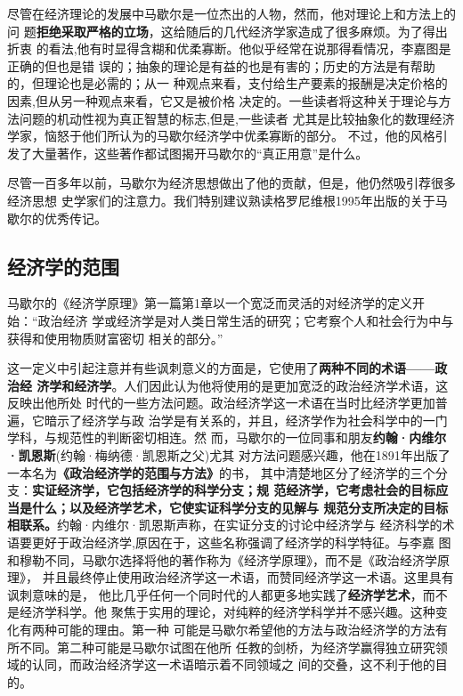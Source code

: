 尽管在经济理论的发展中马歇尔是一位杰出的人物，然而，他对理论上和方法上的问
题\textbf{拒绝采取严格的立场}，这给随后的几代经济学家造成了很多麻烦。为了得出折衷
的看法,他有时显得含糊和优柔寡断。他似乎经常在说那得看情况，李嘉图是正确的但也是错
误的；抽象的理论是有益的也是有害的；历史的方法是有帮助的，但理论也是必需的；从一
种观点来看，支付给生产要素的报酬是决定价格的因素,但从另一种观点来看，它又是被价格
决定的。一些读者将这种关于理论与方法问题的机动性视为真正智慧的标志,但是,一些读者
尤其是比较抽象化的数理经济学家，恼怒于他们所认为的马歇尔经济学中优柔寡断的部分。
不过，他的风格引发了大量著作，这些著作都试图揭开马歇尔的“真正用意”是什么。

尽管一百多年以前，马歇尔为经济思想做出了他的贡献，但是，他仍然吸引荐很多经济思想
史学家们的注意力。我们特别建议熟读格罗尼维根1995年出版的关于马歇尔的优秀传记。

\subsection{经济学的范围}

马歇尔的《经济学原理》第一篇第1章以一个宽泛而灵活的对经济学的定义开始：“政治经济
学或经济学是对人类日常生活的研究；它考察个人和社会行为中与获得和使用物质财富密切
相关的部分。”

这一定义中引起注意并有些讽刺意义的方面是，它使用了\textbf{两种不同的术语——政治经
  济学和经济学}。人们因此认为他将使用的是更加宽泛的政治经济学术语，这反映出他所处
时代的一些方法问题。政治经济学这一术语在当时比经济学更加普遍，它暗示了经济学与政
治学是有关系的，并且，经济学作为社会科学中的一门学科，与规范性的判断密切相连。然
而，马歇尔的一位同事和朋友\textbf{约翰·内维尔·凯恩斯}(约翰·梅纳德·凯恩斯之父)尤其
对方法问题感兴趣，他在1891年出版了一本名为\textbf{《政治经济学的范围与方法》}的书，
其中清楚地区分了经济学的三个分支：\textbf{实证经济学，它包括经济学的科学分支；规
  范经济学，它考虑社会的目标应当是什么；以及经济学艺术，它使实证科学分支的见解与
  规范分支所决定的目标相联系。}约翰·内维尔·凯恩斯声称，在实证分支的讨论中经济学与
经济科学的术语要更好于政治经济学,原因在于，这些名称强调了经济学的科学特征。与李嘉
图和穆勒不同，马歇尔选择将他的著作称为《经济学原理》，而不是《政治经济学原理》，
并且最终停止使用政治经济学这一术语，而赞同经济学这一术语。这里具有讽刺意味的是，
他比几乎任何一个同时代的人都更多地实践了\textbf{经济学艺术}，而不是经济学科学。他
聚焦于实用的理论，对纯粹的经济学科学并不感兴趣。这种变化有两种可能的理由。第一种
可能是马歇尔希望他的方法与政治经济学的方法有所不同。第二种可能是马歇尔试图在他所
任教的剑桥，为经济学赢得独立研究领域的认同，而政治经济学这一术语暗示着不同领域之
间的交叠，这不利于他的目的。

